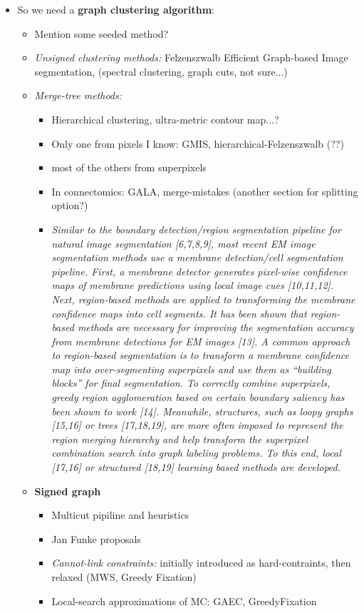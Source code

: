 \begin{itemize}
\item So we need a \textbf{graph clustering algorithm}:
\begin{itemize}
\item Mention some seeded method?
\item \textit{Unsigned clustering methods:} Felzenszwalb Efficient Graph-based Image segmentation, (spectral clustering, graph cuts, not sure...)  
\item \textit{Merge-tree methods:} 
\begin{itemize}
\item Hierarchical clustering, ultra-metric contour map...? 
\item Only one from pixels I know: GMIS, hierarchical-Felzenszwalb (??) 
\item most of the others from superpixels
\item In connectomics: GALA, merge-mistakes (another section for splitting option?)
\item \textit{Similar to the boundary detection/region segmentation pipeline for natural image segmentation [6,7,8,9], most recent EM image segmentation methods use a membrane detection/cell segmentation pipeline. First, a membrane detector generates pixel-wise conﬁdence maps of membrane predictions using local image cues [10,11,12]. Next, region-based methods are applied to transforming the membrane conﬁdence maps into cell segments. It has been shown that region-based methods are necessary for improving the segmentation accuracy from membrane detections for EM images [13]. A common approach to region-based segmentation is to transform a membrane conﬁdence map into over-segmenting superpixels and use them as “building blocks” for ﬁnal segmentation. To correctly combine superpixels, greedy region agglomeration based on certain boundary saliency has been shown to work [14]. Meanwhile, structures, such as loopy graphs [15,16] or trees [17,18,19], are more often imposed to represent the region merging hierarchy and help transform the superpixel combination search into graph labeling problems. To this end, local [17,16] or structured [18,19] learning based methods are developed.}  
\end{itemize}
\item \textbf{Signed graph}
\begin{itemize}
\item Multicut pipiline and heuristics
\item Jan Funke proposals
\item \textit{Cannot-link constraints:} initially introduced as hard-contraints, then relaxed (MWS, Greedy Fixation)
\item Local-search approximations of MC: GAEC, GreedyFixation
\end{itemize}
\end{itemize}

\end{itemize}

